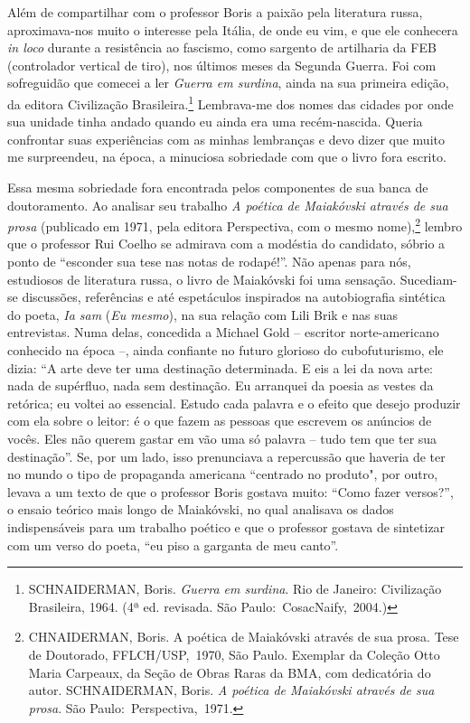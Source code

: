 Além de compartilhar com o professor Boris a paixão pela literatura
russa, aproximava-nos muito o interesse pela Itália, de onde eu vim, e
que ele conhecera \emph{in loco} durante a resistência ao fascismo, como
sargento de artilharia da FEB (controlador vertical de tiro), nos
últimos meses da Segunda Guerra. Foi com sofreguidão que comecei a ler
\emph{Guerra em surdina}, ainda na sua primeira edição, da editora
Civilização Brasileira.\footnote{SCHNAIDERMAN, Boris. \emph{Guerra em
  surdina}. Rio de Janeiro: Civilização Brasileira, 1964. (4ª ed.
  revisada. São Paulo:~CosacNaify,~2004.)} Lembrava-me dos nomes das
cidades por onde sua unidade tinha andado quando eu ainda era uma
recém-nascida. Queria confrontar suas experiências com as minhas
lembranças e devo dizer que muito me surpreendeu, na época, a minuciosa
sobriedade com que o livro fora escrito.

Essa mesma sobriedade fora encontrada pelos componentes de sua banca de
doutoramento. Ao analisar seu trabalho \emph{A poética de Maiakóvski
através de sua prosa} (publicado em 1971, pela editora Perspectiva, com
o mesmo nome),\footnote{CHNAIDERMAN, Boris. A poética de Maiakóvski
  através de sua prosa. Tese de Doutorado, FFLCH/USP,~1970, São Paulo.
  Exemplar da Coleção Otto Maria Carpeaux, da Seção de Obras Raras da
  BMA, com dedicatória do autor. SCHNAIDERMAN, Boris. \emph{A poética de
  Maiakóvski através de sua prosa}. São Paulo:~Perspectiva,~1971.}
lembro que o professor Rui Coelho se admirava com a modéstia do
candidato, sóbrio a ponto de ``esconder sua tese nas notas de rodapé!''.
Não apenas para nós, estudiosos de literatura russa, o livro de
Maiakóvski foi uma sensação. Sucediam-se discussões, referências e até
espetáculos inspirados na autobiografia sintética do poeta, \emph{Ia
sam} (\emph{Eu mesmo}), na sua relação com Lili Brik e nas suas
entrevistas. Numa delas, concedida a Michael Gold -- escritor
norte-americano conhecido na época --, ainda confiante no futuro
glorioso do cubofuturismo, ele dizia: ``A arte deve ter uma destinação
determinada. E eis a lei da nova arte: nada de supérfluo, nada sem
destinação. Eu arranquei da poesia as vestes da retórica; eu voltei ao
essencial. Estudo cada palavra e o efeito que desejo produzir com ela
sobre o leitor: é o que fazem as pessoas que escrevem os anúncios de
vocês. Eles não querem gastar em vão uma só palavra -- tudo tem que ter
sua destinação''. Se, por um lado, isso prenunciava a repercussão que
haveria de ter no mundo o tipo de propaganda americana ``centrado no
produto", por outro, levava a um texto de que o professor Boris gostava
muito: ``Como fazer versos?'', o ensaio teórico mais longo de
Maiakóvski, no qual analisava os dados indispensáveis para um trabalho
poético e que o professor gostava de sintetizar com um verso do poeta,
``eu piso a garganta de meu canto''.

